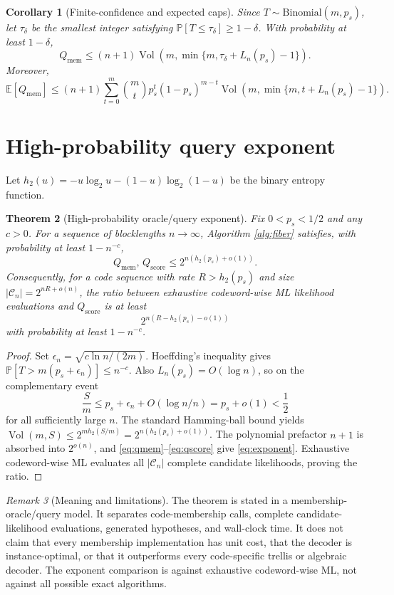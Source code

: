 \documentclass[11pt]{article}
\newtheorem{theorem}{Theorem}
\newtheorem{corollary}[theorem]{Corollary}
\theoremstyle{remark}
\newtheorem{remark}[theorem]{Remark}
\newcommand{\C}{\mathcal C}
\newcommand{\Prb}{\mathbb P}
\newcommand{\Vol}{\operatorname{Vol}}
\begin{document}
\begin{corollary}[Finite-confidence and expected caps]
Since $T\sim\mathrm{Binomial}(m,p_s)$, let $\tau_\delta$ be the smallest integer satisfying
$\Prb[T\le\tau_\delta]\ge1-\delta$.  With probability at least $1-\delta$,
\[
 Q_{\mathrm{mem}}\le(n+1)\Vol\!\left(m,
 \min\{m,\tau_\delta+L_n(p_s)-1\}\right).
\]
Moreover,
\[
 \mathbb E[Q_{\mathrm{mem}}]
 \le(n+1)\sum_{t=0}^{m}\binom mt p_s^t(1-p_s)^{m-t}
 \Vol\!\left(m,\min\{m,t+L_n(p_s)-1\}\right).
\]
\end{corollary}

\section{High-probability query exponent}
Let $h_2(u)=-u\log_2u-(1-u)\log_2(1-u)$ be the binary entropy function.

\begin{theorem}[High-probability oracle/query exponent]
Fix $0<p_s<1/2$ and any $c>0$.  For a sequence of blocklengths $n\to\infty$, Algorithm
\ref{alg:fiber} satisfies, with probability at least $1-n^{-c}$,
\begin{equation}
 Q_{\mathrm{mem}},\,Q_{\mathrm{score}}
 \le 2^{n(h_2(p_s)+o(1))}.
 \label{eq:exponent}
\end{equation}
Consequently, for a code sequence with rate $R>h_2(p_s)$ and size
$|\C_n|=2^{nR+o(n)}$, the ratio between exhaustive codeword-wise ML likelihood evaluations and
$Q_{\mathrm{score}}$ is at least
\[
 2^{n(R-h_2(p_s)-o(1))}
\]
with probability at least $1-n^{-c}$.
\end{theorem}
\begin{proof}
Set $\epsilon_n=\sqrt{c\ln n/(2m)}$. Hoeffding's inequality gives
$\Prb[T>m(p_s+\epsilon_n)]\le n^{-c}$.  Also $L_n(p_s)=O(\log n)$, so on the complementary event
\[
 \frac{S}{m}\le p_s+\epsilon_n+O(\log n/n)=p_s+o(1)<\frac12
\]
for all sufficiently large $n$.  The standard Hamming-ball bound yields
$\Vol(m,S)\le2^{m h_2(S/m)}=2^{n(h_2(p_s)+o(1))}$.  The polynomial prefactor $n+1$ is absorbed
into $2^{o(n)}$, and \eqref{eq:qmem}--\eqref{eq:qscore} give \eqref{eq:exponent}.  Exhaustive
codeword-wise ML evaluates all $|\C_n|$ complete candidate likelihoods, proving the ratio.
\end{proof}

\begin{remark}[Meaning and limitations]
The theorem is stated in a membership-oracle/query model.  It separates code-membership calls,
complete candidate-likelihood evaluations, generated hypotheses, and wall-clock time.  It does not
claim that every membership implementation has unit cost, that the decoder is instance-optimal,
or that it outperforms every code-specific trellis or algebraic decoder.  The exponent comparison
is against exhaustive codeword-wise ML, not against all possible exact algorithms.
\end{remark}
\end{document}

